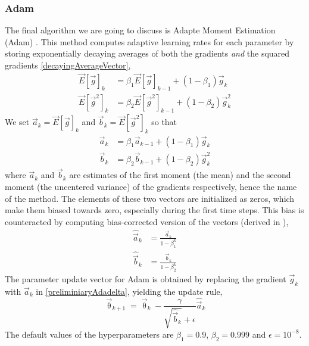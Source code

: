 \documentclass[twoside,english]{uiofysmaster}
\begin{document}
\subsubsection{Adam}
The final algorithm we are going to discuss is Adapte Moment Estimation (Adam) \cite{Kingma14}. This method
computes adaptive learning rates for each parameter by storing 
exponentially decaying averages of both the gradients \textit{and} 
the squared gradients \eqref{decayingAverageVector},
\begin{equation}
 \begin{aligned}
  \vec{E}[\vec{g}]_k &= \beta_1 \vec{E}[\vec{g}]_{k-1} + (1 - \beta_1) \vec{g}_k \\
  \vec{E}[\vec{g}^2]_k &= \beta_2  \vec{E}[\vec{g}^2]_{k-1} + (1 - \beta_2) \vec{g}^2_k
 \end{aligned}
\end{equation}
We set $\vec{a}_k = \vec{E}[\vec{g}]_k$ and $\vec{b}_k = \vec{E}[\vec{g}^2]_k$ so that
\begin{equation}
 \begin{aligned}
 \vec{a}_k &= \beta_1 \vec{a}_{k-1} + (1 - \beta_1) \vec{g}_k \\
 \vec{b}_k &= \beta_2 \vec{b}_{k-1} + (1 - \beta_2) \vec{g}^2_k
 \end{aligned}
\end{equation}
where $\vec{a}_k$ and $\vec{b}_k$ are estimates of the first moment (the mean) and the second moment (the uncentered variance)
of the gradients respectively, hence the name of the method. The elements of these two vectors are initialized as zeros, 
which make them biased towards zero, especially during the first time steps. This bias is counteracted by
computing bias-corrected version of the vectors (derived in \cite{Kingma14}),
\begin{equation}
 \begin{aligned}
 \hat{\vec{a}}_k &= \frac{\vec{a}_k}{1 - \beta_1^k} \\
 \hat{\vec{b}}_k &= \frac{\vec{b}_k}{1 - \beta_2^k}
 \end{aligned}
\end{equation}
The parameter update vector for Adam is obtained by replacing the gradient $\vec{g}_k$ with $\vec{a}_k$ in \eqref{preliminiaryAdadelta},
yielding the update rule,
\begin{equation}
 \vec{\uptheta}_{k+1} = \vec{\uptheta}_k - \frac{\gamma}{\sqrt{\hat{\vec{b}}_k} + \epsilon} \hat{\vec{a}}_k
\end{equation}
The default values of the hyperparameters are $\beta_1 = 0.9$, $\beta_2 = 0.999$ and $\epsilon = 10^{-8}$. 
\end{document}
